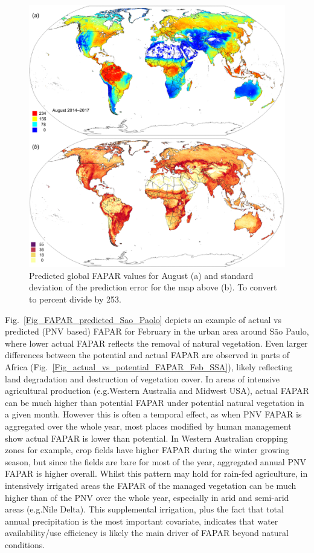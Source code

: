\documentclass[fleqn,10pt,lineno]{wlpeerj} %
\begin{document}
\begin{figure}[!hp]
\centering
\includegraphics[width=\linewidth]{Fig_14.png}
\caption{Predicted global FAPAR values for August (a) and standard deviation of the prediction error for the map above (b). To convert to percent divide by 253.}
\label{Fig_FAPAR_predicted_global}
\end{figure}

Fig.\@~\ref{Fig_FAPAR_predicted_Sao_Paolo} depicts an example of actual vs predicted (PNV based) FAPAR for February in the urban area around S\~{a}o Paulo, where lower actual FAPAR reflects the removal of natural vegetation. Even larger differences between the potential and actual FAPAR are observed in parts of Africa (Fig.\@~\ref{Fig_actual_vs_potential_FAPAR_Feb_SSA}), likely reflecting land degradation and destruction of vegetation cover. In areas of intensive agricultural production (e.g.\@ Western Australia and Midwest USA), actual FAPAR can be much higher than potential FAPAR under potential natural vegetation in a given month. However this is often a temporal effect, as when PNV FAPAR is aggregated over the whole year, most places modified by human management show actual FAPAR is lower than potential. In Western Australian cropping zones for example, crop fields have higher FAPAR during the winter growing season, but since the fields are bare for most of the year, aggregated annual PNV FAPAR is higher overall. Whilst this pattern may hold for rain-fed agriculture, in intensively irrigated areas the FAPAR of the managed vegetation can be much higher than of the PNV over the whole year, especially in arid and semi-arid areas (e.g.\@ Nile Delta). This supplemental irrigation, plus the fact that total annual precipitation is the most important covariate, indicates that water availability/use efficiency is likely the main driver of FAPAR beyond natural conditions.  \par
\end{document}
